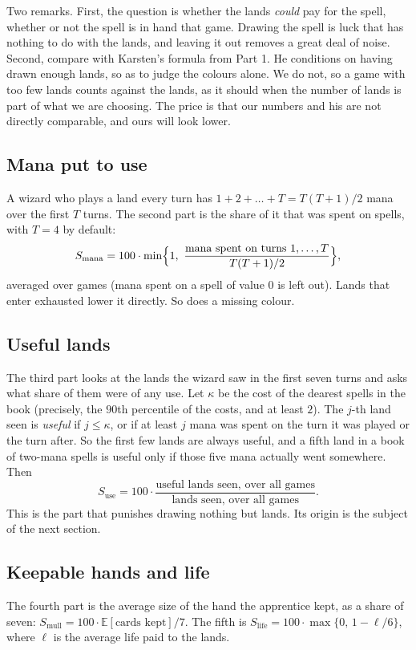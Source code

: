 \documentclass[
    a4paper,
    DIV=13,
    abstract=true,
    numbers=noenddot
]{scrartcl}
\begin{document}
Two remarks. First, the question is whether the lands \emph{could} pay for the spell, whether or not the spell is in hand that game. Drawing the spell is luck that has nothing to do with the lands, and leaving it out removes a great deal of noise. Second, compare with Karsten's formula from Part 1. He conditions on having drawn enough lands, so as to judge the colours alone. We do not, so a game with too few lands counts against the lands, as it should when the number of lands is part of what we are choosing. The price is that our numbers and his are not directly comparable, and ours will look lower.

\subsection{Mana put to use}
A wizard who plays a land every turn has $1+2+\dots+T=T(T+1)/2$ mana over the first $T$ turns. The second part is the share of it that was spent on spells, with $T=4$ by default:
\begin{equation}\label{eq:mana}
  S_{\mathrm{mana}}=100\cdot\min\Bigl\{1,\ \frac{\text{mana spent on turns } 1,\dots,T}{T(T+1)/2}\Bigr\},
\end{equation}
averaged over games (mana spent on a spell of value $0$ is left out). Lands that enter exhausted lower it directly. So does a missing colour.

\subsection{Useful lands}
The third part looks at the lands the wizard saw in the first seven turns and asks what share of them were of any use. Let $\kappa$ be the cost of the dearest spells in the book (precisely, the $90$th percentile of the costs, and at least $2$). The $j$-th land seen is \emph{useful} if $j\le\kappa$, or if at least $j$ mana was spent on the turn it was played or the turn after. So the first few lands are always useful, and a fifth land in a book of two-mana spells is useful only if those five mana actually went somewhere. Then
\begin{equation}\label{eq:use}
  S_{\mathrm{use}}=100\cdot\frac{\text{useful lands seen, over all games}}{\text{lands seen, over all games}} .
\end{equation}
This is the part that punishes drawing nothing but lands. Its origin is the subject of the next section.

\subsection{Keepable hands and life}
The fourth part is the average size of the hand the apprentice kept, as a share of seven: $S_{\mathrm{mull}}=100\cdot\mathbb{E}[\text{cards kept}]/7$. The fifth is $S_{\mathrm{life}}=100\cdot\max\{0,\,1-\ell/6\}$, where $\ell$ is the average life paid to the lands.
\end{document}
